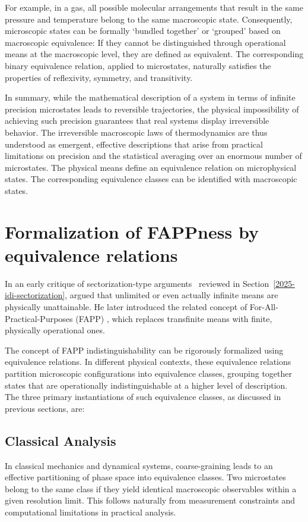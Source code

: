 \documentclass[shortAfour,sageh,times]{sagej}
\begin{document}
For example, in a gas, all possible molecular arrangements that result in the same pressure and temperature belong to the same macroscopic state.
Consequently, microscopic states can be formally `bundled together' or `grouped' based on macroscopic equivalence:
If they cannot be distinguished through operational means at the macroscopic level, they are defined as equivalent.
The corresponding binary equivalence relation, applied to microstates, naturally satisfies the properties of reflexivity, symmetry, and transitivity.



In summary, while the mathematical description of a system in terms of infinite precision microstates leads to reversible trajectories, the physical impossibility of achieving such precision guarantees that real systems display irreversible behavior.
The irreversible macroscopic laws of thermodynamics are thus understood as emergent, effective descriptions that arise from practical limitations on precision and the statistical averaging over an enormous number of microstates.
The physical means define an equivalence relation on microphysical states. The corresponding equivalence classes can be identified with macroscopic states.



\section{Formalization of FAPPness by equivalence relations}


In an early critique of sectorization-type arguments~\citep{hepp-1972,bub-2015} reviewed in Section~\ref{2025-idi-sectorization}, \cite{Bell-1975} argued that unlimited or even actually infinite means are physically unattainable.
He later introduced the related concept of For-All-Practical-Purposes (FAPP) \citep{bell-a},
which replaces transfinite means with finite, physically operational ones.

The concept of FAPP indistinguishability can be rigorously formalized using equivalence relations. In different physical contexts, these equivalence relations partition microscopic configurations into equivalence classes, grouping together states that are operationally indistinguishable at a higher level of description. The three primary instantiations of such equivalence classes, as discussed in previous sections, are:

\subsection{Classical Analysis}
In classical mechanics and dynamical systems, coarse-graining leads to an effective partitioning of phase space into equivalence classes. Two microstates belong to the same class if they yield identical macroscopic observables within a given resolution limit. This follows naturally from measurement constraints and computational limitations in practical analysis.
\end{document}
